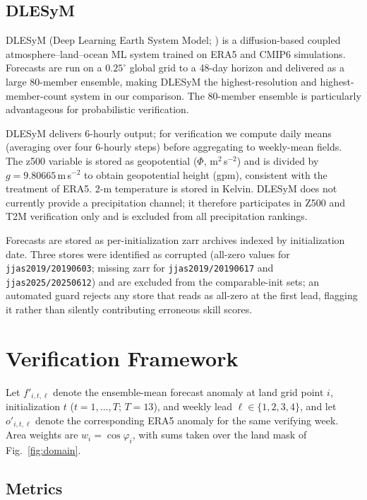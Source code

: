 \documentclass[11pt,a4paper]{article}
\begin{document}
\subsection{DLESyM}\label{sec:delysm}

DLESyM (Deep Learning Earth System Model; \citealt{cresswellclay2024}) is a
diffusion-based coupled atmosphere--land--ocean ML system trained on ERA5 and
CMIP6 simulations. Forecasts are run on a $0.25^\circ$ global grid to a 48-day
horizon and delivered as a large 80-member ensemble, making DLESyM the
highest-resolution and highest-member-count system in our comparison. The 80-member
ensemble is particularly advantageous for probabilistic verification.

DLESyM delivers 6-hourly output; for verification we compute daily means (averaging
over four 6-hourly steps) before aggregating to weekly-mean fields. The z500 variable
is stored as geopotential ($\Phi$, m$^2$\,s$^{-2}$) and is divided by
$g = 9.80665$\,m\,s$^{-2}$ to obtain geopotential height (gpm), consistent with the
treatment of ERA5. 2-m temperature is stored in Kelvin. DLESyM does not currently
provide a precipitation channel; it therefore participates in Z500 and T2M
verification only and is excluded from all precipitation rankings.

Forecasts are stored as per-initialization zarr archives indexed by initialization
date. Three stores were identified as corrupted (all-zero values for
\texttt{jjas2019/20190603}; missing zarr for \texttt{jjas2019/20190617} and
\texttt{jjas2025/20250612}) and are excluded from the comparable-init sets; an
automated guard rejects any store that reads as all-zero at the first lead, flagging
it rather than silently contributing erroneous skill scores.

\section{Verification Framework}\label{sec:verif}

Let $f'_{i,t,\ell}$ denote the ensemble-mean forecast anomaly at land
grid point $i$, initialization $t$ ($t=1,\dots,T$; $T=13$), and weekly
lead $\ell\in\{1,2,3,4\}$, and let $o'_{i,t,\ell}$ denote the
corresponding ERA5 anomaly for the same verifying week. Area weights
are $w_i=\cos\varphi_i$, with sums taken over the land mask of
Fig.~\ref{fig:domain}.

\subsection{Metrics}\label{sec:metrics}
\end{document}
